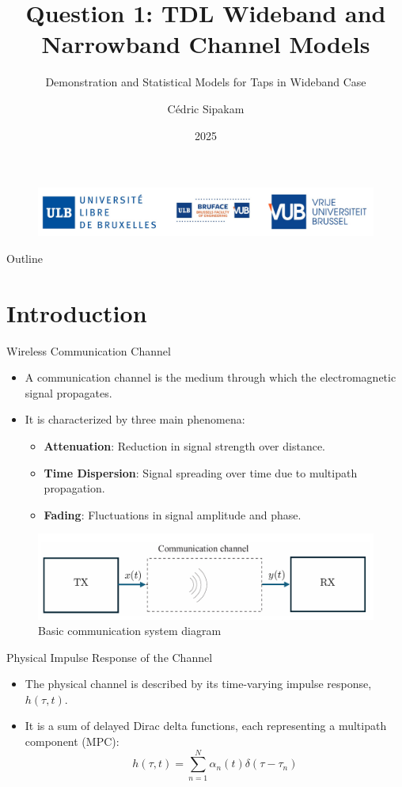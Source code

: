 \documentclass{beamer}
\title[TDL Wideband and Narrowband Channel Models]{Question 1: TDL Wideband and Narrowband Channel Models}
\subtitle{Demonstration and Statistical Models for Taps in Wideband Case}
\author{Cédric Sipakam}
\institute{ULB | VUB \\
	\vspace{1.5em}
	ELEC-H415: Communication Channels}
\date{2025}
\begin{document}
	\begin{frame}
		\begin{figure}
			\centering
			\includegraphics[width=0.7\linewidth]{pictures/logos}
		\end{figure}
		\titlepage
	\end{frame}
	
	\begin{frame}{Outline}
		\tableofcontents
	\end{frame}
	
	\section{Introduction}
	
	\begin{frame}{Wireless Communication Channel}
		\begin{itemize}
			\item A communication channel is the medium through which the electromagnetic signal propagates.
			\item It is characterized by three main phenomena:
			\begin{itemize}
				\item \textbf{Attenuation}: Reduction in signal strength over distance.
				\item \textbf{Time Dispersion}: Signal spreading over time due to multipath propagation.
				\item \textbf{Fading}: Fluctuations in signal amplitude and phase.
			\end{itemize}
		\end{itemize}
		\begin{figure}
			\centering
			\includegraphics[width=0.8\linewidth]{"pictures/wireless-comm-channel.png"}
			\caption{Basic communication system diagram}
		\end{figure}
	\end{frame}
	
	
	\begin{frame}{Physical Impulse Response of the Channel}
		\begin{itemize}
			\item The physical channel is described by its time-varying impulse response, $h(\tau, t)$.
			\item It is a sum of delayed Dirac delta functions, each representing a multipath component (MPC):
			\[
			h(\tau,t) = \sum_{n=1}^{N} \alpha_n(t) \delta(\tau - \tau_n)
			\]
		\end{itemize}
	\end{frame}
	
\end{document}
